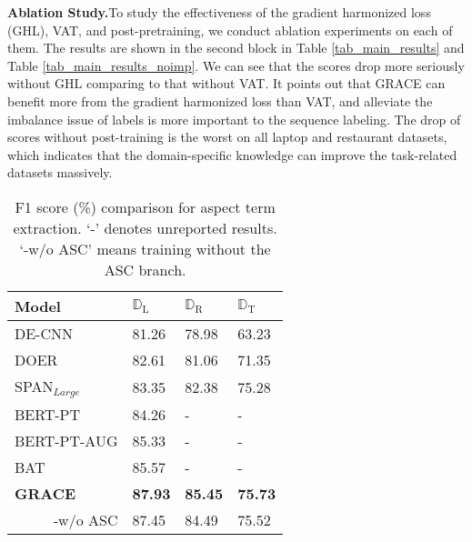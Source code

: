 \documentclass[11pt,a4paper]{article}
\begin{document}
\vspace{+1mm}
\noindent
\textbf{Ablation Study.}\quad To study the effectiveness of the gradient harmonized loss (GHL), VAT, and post-pretraining, we conduct ablation experiments on each of them. The results are shown in the second block in Table \ref{tab_main_results} and Table \ref{tab_main_results_noimp}. We can see that the scores drop more seriously without GHL comparing to that without VAT. It points out that GRACE can benefit more from the gradient harmonized loss than VAT, and alleviate the imbalance issue of labels is more important to the sequence labeling. The drop of scores without post-training is the worst on all laptop and restaurant datasets, which indicates that the domain-specific knowledge can improve the task-related datasets massively.
\begin{table}[tp]
    \begin{center}
        \begin{tabular}{|l|p{1.1cm}<{\centering}|p{1.1cm}<{\centering}|p{1.1cm}<{\centering}|}
            \hline
            Model     & $\mathbb{D}_\text{L}$ & $\mathbb{D}_\text{R}$ & $\mathbb{D}_\text{T}$ \\ \hline \hline
            DE-CNN             & 81.26 & 78.98 & 63.23  \\ 
            DOER               & 82.61 & 81.06 & 71.35 \\ 
            SPAN$_{Large}$     & 83.35 & 82.38 & 75.28 \\ 
            BERT-PT            & 84.26 & - & - \\ 
            BERT-PT-AUG        & 85.33 & - & - \\ 
            BAT                & 85.57 & - & - \\ 
            \hline
            \textbf{GRACE}      & \textbf{87.93} & \textbf{85.45} & \textbf{75.73} \\ 
            \multicolumn{1}{|r|}{-w/o ASC} & 87.45 & 84.49 & 75.52 \\ 
            \hline
            \end{tabular}
    \end{center}
    \caption{\label{table_results_ate} F1 score (\%) comparison for aspect term extraction. `-' denotes unreported results. `-w/o ASC' means training without the ASC branch.}
\end{table}
\end{document}
